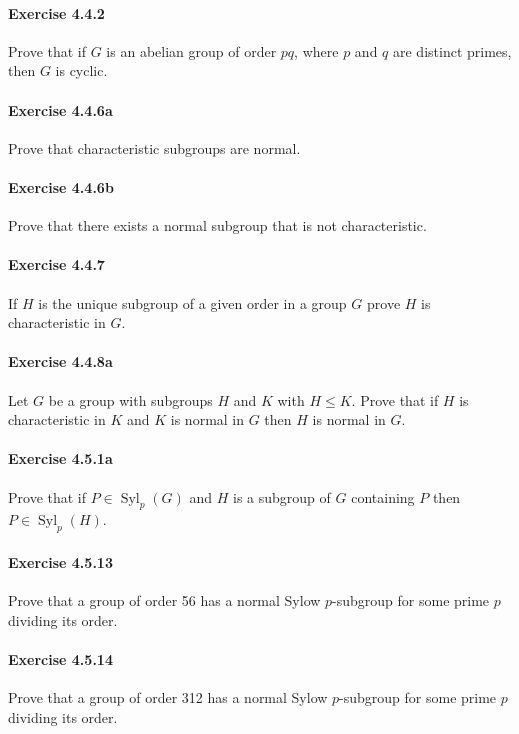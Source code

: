 \documentclass{article}
\begin{document}
\paragraph{Exercise 4.4.2} Prove that if $G$ is an abelian group of order $p q$, where $p$ and $q$ are distinct primes, then $G$ is cyclic.

\paragraph{Exercise 4.4.6a} Prove that characteristic subgroups are normal.

\paragraph{Exercise 4.4.6b} Prove that there exists a normal subgroup that is not characteristic.

\paragraph{Exercise 4.4.7} If $H$ is the unique subgroup of a given order in a group $G$ prove $H$ is characteristic in $G$.

\paragraph{Exercise 4.4.8a} Let $G$ be a group with subgroups $H$ and $K$ with $H \leq K$. Prove that if $H$ is characteristic in $K$ and $K$ is normal in $G$ then $H$ is normal in $G$.

\paragraph{Exercise 4.5.1a} Prove that if $P \in \operatorname{Syl}_{p}(G)$ and $H$ is a subgroup of $G$ containing $P$ then $P \in \operatorname{Syl}_{p}(H)$.

\paragraph{Exercise 4.5.13} Prove that a group of order 56 has a normal Sylow $p$-subgroup for some prime $p$ dividing its order.

\paragraph{Exercise 4.5.14} Prove that a group of order 312 has a normal Sylow $p$-subgroup for some prime $p$ dividing its order.
\end{document}

